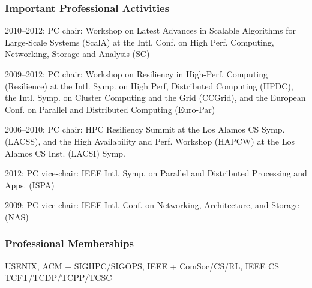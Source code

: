 \vspace*{-2ex}
\subsubsection*{Important Professional Activities}
\vspace*{-1ex}

\begin{compactitem}[0000--0000 :]
  \item[2010--2012\hfill :]
    PC chair:
    Workshop on Latest Advances in Scalable Algorithms
    for Large-Scale Systems (ScalA) at the Intl.
    Conf. on High Perf. Computing, Networking,
    Storage and Analysis (SC)
  \item[2009--2012\hfill :]
    PC chair:
    Workshop on Resiliency in
    High-Perf. Computing (Resilience) at the
    Intl. Symp. on
    High Perf, Distributed Computing (HPDC), the
    Intl. Symp. on
    Cluster Computing and the Grid (CCGrid), and the
    European Conf. on
    Parallel and Distributed Computing (Euro-Par)
  \item[2006--2010\hfill :]
    PC chair:
    HPC Resiliency Summit at the
    Los Alamos CS Symp. (LACSS),
    and the
    High Availability and Perf. Workshop (HAPCW)
    at the Los Alamos CS Inst. (LACSI) Symp.
  \item[2012\hfill :]
    PC vice-chair:
    IEEE Intl. Symp. on Parallel and Distributed
    Processing and Apps. (ISPA)
  \item[2009\hfill :]
    PC vice-chair:
    IEEE Intl. Conf. on Networking, Architecture, and
    Storage (NAS)
\end{compactitem}

\vspace*{-2ex}
\subsubsection*{Professional Memberships}
\vspace*{-1ex}

USENIX,
ACM + SIGHPC/SIGOPS,
IEEE + ComSoc/CS/RL,
IEEE CS TCFT/TCDP/TCPP/TCSC

\vspace*{-2ex}
